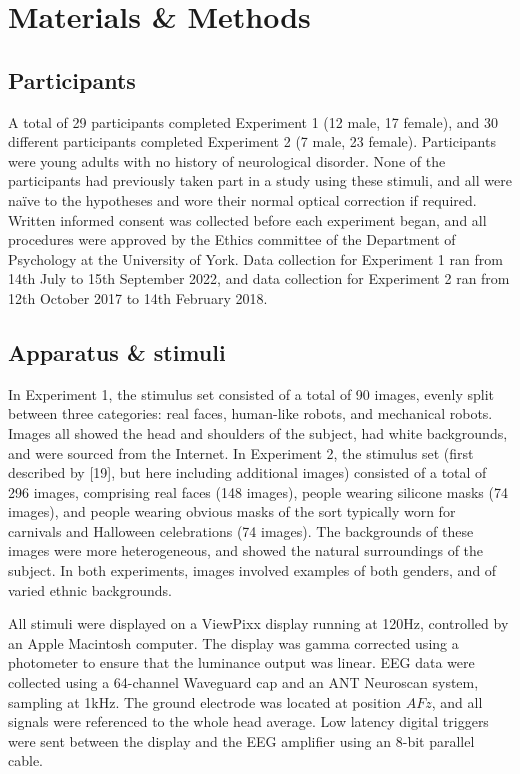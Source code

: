 \documentclass[
]{article}
\begin{document}
\section{Materials \& Methods}\label{materials-methods}

\subsection{Participants}\label{participants}

A total of 29 participants completed Experiment 1 (12 male, 17 female), and 30 different participants completed Experiment 2 (7 male, 23 female). Participants were young adults with no history of neurological disorder. None of the participants had previously taken part in a study using these stimuli, and all were naïve to the hypotheses and wore their normal optical correction if required. Written informed consent was collected before each experiment began, and all procedures were approved by the Ethics committee of the Department of Psychology at the University of York. Data collection for Experiment 1 ran from 14th July to 15th September 2022, and data collection for Experiment 2 ran from 12th October 2017 to 14th February 2018.

\subsection{Apparatus \& stimuli}\label{apparatus-stimuli}

In Experiment 1, the stimulus set consisted of a total of 90 images, evenly split between three categories: real faces, human-like robots, and mechanical robots. Images all showed the head and shoulders of the subject, had white backgrounds, and were sourced from the Internet. In Experiment 2, the stimulus set (first described by {[}19{]}, but here including additional images) consisted of a total of 296 images, comprising real faces (148 images), people wearing silicone masks (74 images), and people wearing obvious masks of the sort typically worn for carnivals and Halloween celebrations (74 images). The backgrounds of these images were more heterogeneous, and showed the natural surroundings of the subject. In both experiments, images involved examples of both genders, and of varied ethnic backgrounds.

All stimuli were displayed on a ViewPixx display running at 120Hz, controlled by an Apple Macintosh computer. The display was gamma corrected using a photometer to ensure that the luminance output was linear. EEG data were collected using a 64-channel Waveguard cap and an ANT Neuroscan system, sampling at 1kHz. The ground electrode was located at position \(AFz\), and all signals were referenced to the whole head average. Low latency digital triggers were sent between the display and the EEG amplifier using an 8-bit parallel cable.
\end{document}
